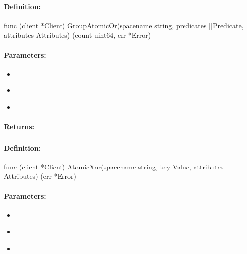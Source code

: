 \paragraph{Definition:}
\begin{gocode}
func (client *Client) GroupAtomicOr(spacename string, predicates []Predicate, attributes Attributes) (count uint64, err *Error)
\end{gocode}

\paragraph{Parameters:}
\begin{itemize}[noitemsep]
\item {}\\

\item {}\\

\item {}\\

\end{itemize}

\paragraph{Returns:}


\pagebreak
\subsubsection{}
\label{api:Go:AtomicXor}


\paragraph{Definition:}
\begin{gocode}
func (client *Client) AtomicXor(spacename string, key Value, attributes Attributes) (err *Error)
\end{gocode}

\paragraph{Parameters:}
\begin{itemize}[noitemsep]
\item {}\\

\item {}\\

\item {}\\

\end{itemize}

